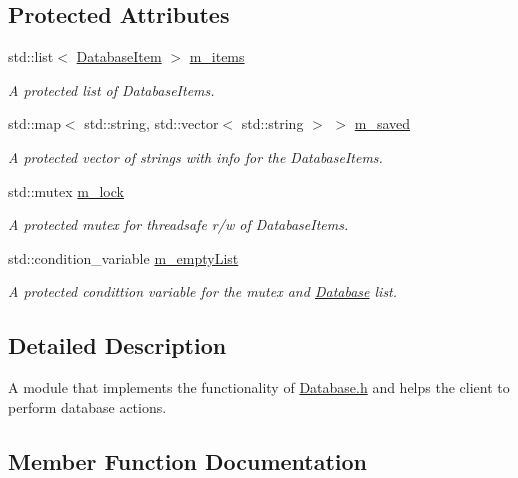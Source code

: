 \subsection*{Protected Attributes}
\begin{DoxyCompactItemize}
\item 
std\+::list$<$ \hyperlink{classDatabaseItem}{Database\+Item} $>$ \hyperlink{classDatabase_a5a4ac1f3bf0f5fd77a696174ad9e5c45}{m\+\_\+items}
\begin{DoxyCompactList}\small\item\em A protected list of Database\+Items. \end{DoxyCompactList}\item 
std\+::map$<$ std\+::string, std\+::vector$<$ std\+::string $>$ $>$ \hyperlink{classDatabase_a9f87cbe5a1be71d541083dffa8d8c9ad}{m\+\_\+saved}
\begin{DoxyCompactList}\small\item\em A protected vector of strings with info for the Database\+Items. \end{DoxyCompactList}\item 
std\+::mutex \hyperlink{classDatabase_a7f55f3a5d93c9694ee4f08a2f2135b1d}{m\+\_\+lock}
\begin{DoxyCompactList}\small\item\em A protected mutex for threadsafe r/w of Database\+Items. \end{DoxyCompactList}\item 
std\+::condition\+\_\+variable \hyperlink{classDatabase_a2ad8bf38964b3e18a0e168437acbdb27}{m\+\_\+empty\+List}
\begin{DoxyCompactList}\small\item\em A protected condittion variable for the mutex and \hyperlink{classDatabase}{Database} list. \end{DoxyCompactList}\end{DoxyCompactItemize}


\subsection{Detailed Description}
A module that implements the functionality of \hyperlink{Database_8h_source}{Database.\+h} and helps the client to perform database actions. 



\subsection{Member Function Documentation}
\mbox{\label{classMovieDatabase_ac0bb39b8be599ffea76081809ae42dda}} 
